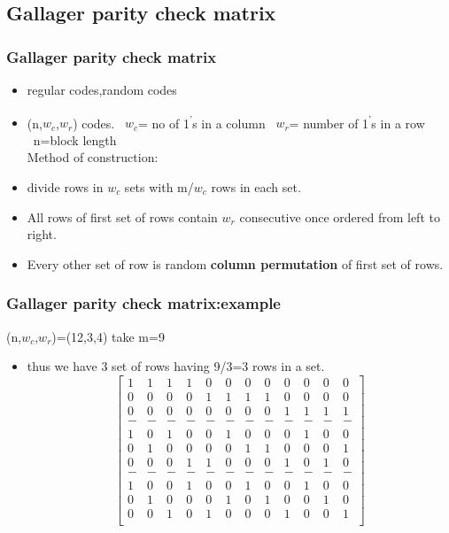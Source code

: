 \documentclass[xcolor=dvipsname]
{beamer}
\begin{document}
\subsection{Gallager parity check matrix}
\begin{frame}[t] 
\frametitle{Gallager parity check matrix}
\begin{itemize}
\item regular codes,random codes
\item (n,$w_c$,$w_r$) codes. \ $w_c$= no of 1\textsuperscript{'}s in a column \ $w_r$= number of 1\textsuperscript{'}s in a row \ n=block length
\\ \alert{Method of construction:}
\item divide rows in $w_c$ sets with m/$w_c$ rows in each set.
\item All rows of first set of rows contain $w_r$ consecutive once ordered from left to right.
\item Every other set of row is random \textbf{column permutation} of first set of rows. 
\end{itemize}         
\end{frame}
\begin{frame}[t] 
\frametitle{Gallager parity check matrix:example}
 (n,$w_c$,$w_r$)=(12,3,4) take m=9
 \begin{itemize}
 \item thus we have 3 set of rows having 9/3=3 rows in a set. 
  \[
 \left[ \begin{array}{cccccccccccc}
1 &  1 &  1  & 1 &  0 & 0 & 0 & 0 & 0 & 0 & 0 & 0 \\
0 & 0 & 0 & 0 & 1 &  1 &  1  & 1 & 0 & 0 & 0 & 0 \\
0 & 0 & 0 & 0 & 0 & 0 & 0 & 0 & 1 &  1 &  1  & 1 \\
-& - & - & - & - & - & - & - & - &  - &  -  & -\\ 
1 &  0 &  1  & 0 &  0 & 1 & 0 & 0 & 0 & 1 & 0 & 0 \\
0 & 1 & 0 & 0 & 0 &  0 &  1  & 1 & 0 & 0 & 0 & 1 \\
0 & 0 & 0 & 1 & 1 & 0 & 0 & 0 & 1 &  0 &  1  &  0\\
-& - & - & - & - & - & - & - & - &  - &  -  & -\\ 
1 & 0 & 0 & 1 & 0 & 0 & 1 & 0 & 0 & 1 & 0 & 0 \\
0 & 1 & 0 & 0 & 0 & 1 & 0 & 1 & 0 & 0 & 1 & 0 \\
0 & 0 & 1 & 0 & 1 & 0 & 0 & 0 & 1 & 0 & 0 & 1 \\ \end{array} \right]  
\] 
 \end{itemize}
\end{frame}
\end{document}
